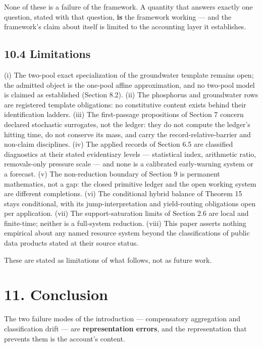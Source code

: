 \documentclass[11pt]{article}
\begin{document}
None of these is a failure of the framework. A quantity that answers exactly one question, stated with that question, \textbf{is} the framework working --- and the framework's claim about itself is limited to the accounting layer it establishes.

\subsection*{10.4 Limitations}\label{104-limitations}

(i) The two-pool exact specialization of the groundwater template remains open; the admitted object is the one-pool affine approximation, and no two-pool model is claimed as established (Section 8.2). (ii) The phosphorus and groundwater rows are registered template obligations: no constitutive content exists behind their identification ladders. (iii) The first-passage propositions of Section 7 concern declared stochastic surrogates, not the ledger: they do not compute the ledger's hitting time, do not conserve its mass, and carry the record-relative-barrier and non-claim disciplines. (iv) The applied records of Section 6.5 are classified diagnostics at their stated evidentiary levels --- statistical index, arithmetic ratio, removals-only pressure scale --- and none is a calibrated early-warning system or a forecast. (v) The non-reduction boundary of Section 9 is permanent mathematics, not a gap: the closed primitive ledger and the open working system are different completions. (vi) The conditional hybrid balance of Theorem 15 stays conditional, with its jump-interpretation and yield-routing obligations open per application. (vii) The support-saturation limits of Section 2.6 are local and finite-time; neither is a full-system reduction. (viii) This paper asserts nothing empirical about any named resource system beyond the classifications of public data products stated at their source status.

\vspace{0.8em}

These are stated as limitations of what follows, not as future work.

\section*{11. Conclusion}\label{11-conclusion}

The two failure modes of the introduction --- compensatory aggregation and classification drift --- are \textbf{representation errors}, and the representation that prevents them is the account's content.
\end{document}
